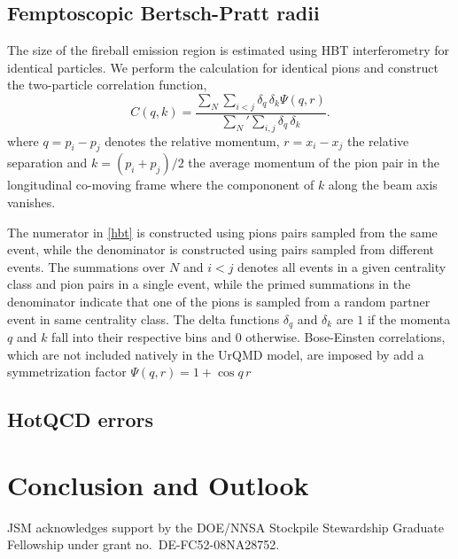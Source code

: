 \documentclass[aps,prc,reprint,amsmath,nofootinbib,superscriptaddress]{revtex4-1}
\begin{document}
\subsection{Femptoscopic Bertsch-Pratt radii}
\label{hbt}

The size of the fireball emission region is estimated using HBT interferometry for identical particles. We perform the calculation for identical pions and construct the two-particle correlation function, 
\begin{equation}
 \label{hbt}
 C(q, k) = \frac{\sum\limits_N \sum\limits_{i < j} \delta_{q} \, \delta_{k}\Psi(q,r)}{\sum\limits_{N}' \sum\limits_{i,j} \delta_{q} \, \delta_{k}}.
\end{equation}
where $q = p_i - p_j$ denotes the relative momentum, $r=x_i-x_j$ the relative separation and $k = (p_i + p_j)/2$ the average momentum of the pion pair in the longitudinal co-moving frame where the compononent of $k$ along
the beam axis vanishes.

The numerator in \eqref{hbt} is constructed using pions pairs sampled from the same event, while the denominator is constructed using pairs sampled from different events. The summations over $N$ and $i < j$ denotes all events in a given 
centrality class and pion pairs in a single event, while the primed summations in the denominator indicate that one of the pions is sampled from a random partner event in same centrality class. 
The delta functions $\delta_q$ and $\delta_k$ are $1$ if the momenta $q$ and $k$ fall into their respective bins and $0$ otherwise. Bose-Einsten correlations, which are not included natively in the UrQMD model, are imposed by add a symmetrization factor $\Psi(q,r) = 1 + \cos q\,r$ 


\subsection{HotQCD errors}
\label{errors}

\section{Conclusion and Outlook}

\begin{acknowledgments}
 JSM acknowledges support by the DOE/NNSA Stockpile Stewardship Graduate Fellowship under grant no.~DE-FC52-08NA28752.
\end{acknowledgments}


\end{document}
